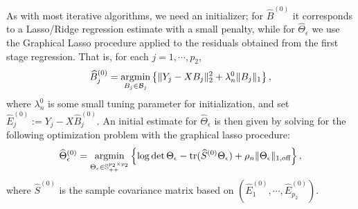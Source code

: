 As with most iterative algorithms, we need an initializer; for $\widehat{B}^{(0)}$ it corresponds to a Lasso/Ridge regression estimate with a small penalty, while for $\widehat{\Theta}_\epsilon$ we use the Graphical Lasso procedure applied to the residuals obtained from the first stage regression. That is, for each $j=1,\cdots,p_2$, 
\begin{equation}\label{eqn:initialB}
\widehat{B}_j^{(0)} = \mathop{\text{argmin}}\limits_{B_j\in\mathcal{B}_j} \left\{ \|Y_j - XB_j\|^2_2 + \lambda_n^0 \|B_j\|_1\right\},
\end{equation}
where $\lambda_n^0$ is some small tuning parameter for initialization, and set  $\widehat{E}^{(0)}_j := Y_j-X\widehat{B}_j^{(0)}$. An initial estimate for $\widehat{\Theta}_\epsilon$ is then given by solving for the following optimization problem with the graphical lasso \citep{friedman2008sparse} procedure:
 \begin{equation*}\label{eqn:initialTheta}
 \widehat{\Theta}_\epsilon^{(0)} = \mathop{\text{argmin}}\limits_{\Theta_\epsilon\in\mathbb{S}_{++}^{p_2\times p_2}} \left\{
 \log\det\Theta_\epsilon - \text{tr}(\widehat{S}^{(0)}\Theta_\epsilon) + \rho_n\|\Theta_\epsilon\|_{1,\text{off}}
 \right\},
 \end{equation*}
where $\widehat{S}^{(0)}$ is the sample covariance matrix based on $(\widehat{E}^{(0)}_1,\cdots,\widehat{E}^{(0)}_{p_2})$.\\


